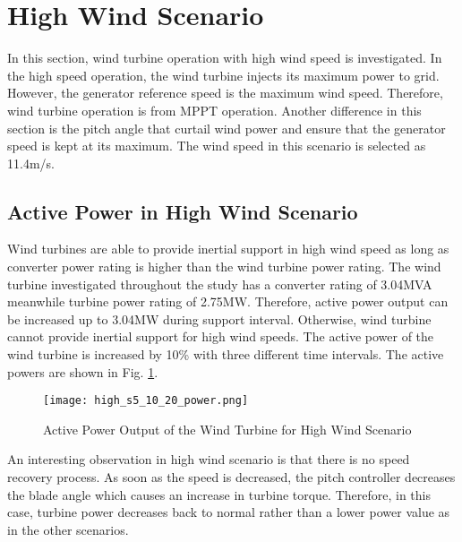 \section{High Wind Scenario}
In this section, wind turbine operation with high wind speed is investigated. In the high speed operation, the wind turbine injects its maximum power to grid. However, the generator reference speed is the maximum wind speed. Therefore, wind turbine operation is from MPPT operation. Another difference in this section is the pitch angle that curtail wind power and ensure that the generator speed is kept at its maximum. The wind speed in this scenario is selected as 11.4m/s.\par
\subsection{Active Power in High Wind Scenario}
Wind turbines are able to provide inertial support in high wind speed as long as converter power rating is higher than the wind turbine power rating. The wind turbine investigated throughout the study has a converter rating of 3.04MVA meanwhile turbine power rating of 2.75MW. Therefore, active power output can be increased up to 3.04MW during support interval. Otherwise, wind turbine cannot provide inertial support for high wind speeds. The active power of the wind turbine is increased by 10\% with three different time intervals. The active powers are shown in Fig. \ref{high_powers}.\par
\begin{figure}[h!]
	\centering
	\texttt{[image: high\_s5\_10\_20\_power.png]}
	\caption{Active Power Output of the Wind Turbine for High Wind Scenario}
	\label{high_powers}
\end{figure}
An interesting observation in high wind scenario is that there is no speed recovery process. As soon as the speed is decreased, the pitch controller decreases the blade angle which causes an increase in turbine torque. Therefore, in this case, turbine power decreases back to normal rather than a lower power value as in the other scenarios.
